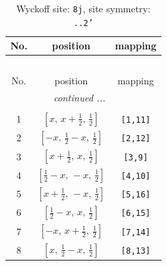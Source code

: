 \documentclass[fleqn,8pt]{jsarticle}
\begin{document}
\begin{longtable}{ccc}
\caption{Wyckoff site: {\tt 8j}, site symmetry: {\tt ..2'}}
 \\
 \hline \hline
No. & position & mapping \\ \hline \endfirsthead

\multicolumn{2}{l}{\tablename\ \thetable{}} \\
 \hline \hline
No. & position & mapping \\ \hline \endhead

 \hline \hline
\multicolumn{2}{r}{\footnotesize\it continued ...} \\ \endfoot

 \hline \hline
\multicolumn{2}{r}{} \\ \endlastfoot

1 & $\left[ x,\, x + \frac{1}{2},\, \frac{1}{2} \right]$ & {\tt [1,11]} \\ \hline
2 & $\left[ - x,\, \frac{1}{2} - x,\, \frac{1}{2} \right]$ & {\tt [2,12]} \\ \hline
3 & $\left[ x + \frac{1}{2},\, x,\, \frac{1}{2} \right]$ & {\tt [3,9]} \\ \hline
4 & $\left[ \frac{1}{2} - x,\, - x,\, \frac{1}{2} \right]$ & {\tt [4,10]} \\ \hline
5 & $\left[ x + \frac{1}{2},\, - x,\, \frac{1}{2} \right]$ & {\tt [5,16]} \\ \hline
6 & $\left[ \frac{1}{2} - x,\, x,\, \frac{1}{2} \right]$ & {\tt [6,15]} \\ \hline
7 & $\left[ - x,\, x + \frac{1}{2},\, \frac{1}{2} \right]$ & {\tt [7,14]} \\ \hline
8 & $\left[ x,\, \frac{1}{2} - x,\, \frac{1}{2} \right]$ & {\tt [8,13]} \\
\end{longtable}
\renewcommand{\arraystretch}{1.2}
\end{document}
